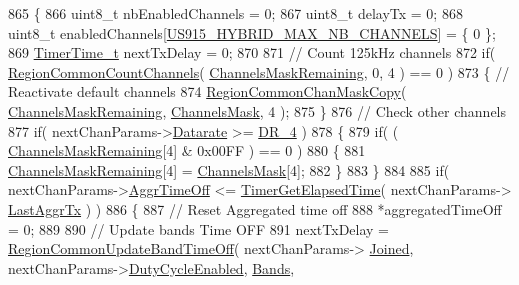 \begin{DoxyCode}
865 \{
866     uint8\_t nbEnabledChannels = 0;
867     uint8\_t delayTx = 0;
868     uint8\_t enabledChannels[\mbox{\hyperlink{group___r_e_g_i_o_n_u_s915_h_y_b_ga977b73cbf7a5d15e2bf543fad5f35710}{US915\_HYBRID\_MAX\_NB\_CHANNELS}}] = \{ 0 \};
869     \mbox{\hyperlink{utilities_8h_a4215ca43d3e953099ea758ce428599d0}{TimerTime\_t}} nextTxDelay = 0;
870 
871     \textcolor{comment}{// Count 125kHz channels}
872     \textcolor{keywordflow}{if}( \mbox{\hyperlink{group___r_e_g_i_o_n_c_o_m_m_o_n_gac23f0831812f610f57f42f6cf87368c9}{RegionCommonCountChannels}}( 
      \mbox{\hyperlink{_region_u_s915-_hybrid_8c_a567333cec639a004655cc1717e9d0928}{ChannelsMaskRemaining}}, 0, 4 ) == 0 )
873     \{ \textcolor{comment}{// Reactivate default channels}
874         \mbox{\hyperlink{group___r_e_g_i_o_n_c_o_m_m_o_n_ga95f5199d490113269fae7f2e0569e9a0}{RegionCommonChanMaskCopy}}( \mbox{\hyperlink{_region_u_s915-_hybrid_8c_a567333cec639a004655cc1717e9d0928}{ChannelsMaskRemaining}}, 
      \mbox{\hyperlink{_region_u_s915-_hybrid_8c_a2188957b5ca6af8092154d7ccbfa5757}{ChannelsMask}}, 4  );
875     \}
876     \textcolor{comment}{// Check other channels}
877     \textcolor{keywordflow}{if}( nextChanParams->\mbox{\hyperlink{structs_next_chan_params_ae2f6080f3aa0e9485c55513ca56bb24d}{Datarate}} >= \mbox{\hyperlink{group___r_e_g_i_o_n_ga6ceba6158a7dab238e9d0b846fb47a0c}{DR\_4}} )
878     \{
879         \textcolor{keywordflow}{if}( ( \mbox{\hyperlink{_region_u_s915-_hybrid_8c_a567333cec639a004655cc1717e9d0928}{ChannelsMaskRemaining}}[4] & 0x00FF ) == 0 )
880         \{
881             \mbox{\hyperlink{_region_u_s915-_hybrid_8c_a567333cec639a004655cc1717e9d0928}{ChannelsMaskRemaining}}[4] = \mbox{\hyperlink{_region_u_s915-_hybrid_8c_a2188957b5ca6af8092154d7ccbfa5757}{ChannelsMask}}[4];
882         \}
883     \}
884 
885     \textcolor{keywordflow}{if}( nextChanParams->\mbox{\hyperlink{structs_next_chan_params_a3609676d2d3b7c00e25615324b35cb26}{AggrTimeOff}} <= \mbox{\hyperlink{time_server_8c_a9ca7e27f3d6474daff63f2e093a2e91e}{TimerGetElapsedTime}}( nextChanParams->
      \mbox{\hyperlink{structs_next_chan_params_a381b728f60b185ecf3313e974c18768b}{LastAggrTx}} ) )
886     \{
887         \textcolor{comment}{// Reset Aggregated time off}
888         *aggregatedTimeOff = 0;
889 
890         \textcolor{comment}{// Update bands Time OFF}
891         nextTxDelay = \mbox{\hyperlink{group___r_e_g_i_o_n_c_o_m_m_o_n_ga2e26fe6b49ca26edf7052eadd7f18b3a}{RegionCommonUpdateBandTimeOff}}( nextChanParams->
      \mbox{\hyperlink{structs_next_chan_params_ac2f6caa0f3b02d2ac5056c3ee7c22652}{Joined}}, nextChanParams->\mbox{\hyperlink{structs_next_chan_params_a4d755868e0e80089462286c3ba6a6f18}{DutyCycleEnabled}}, \mbox{\hyperlink{_region_u_s915-_hybrid_8c_acdf8c87a5e1e73b468dbf151f92e2273}{Bands}}, 

\end{DoxyCode}
